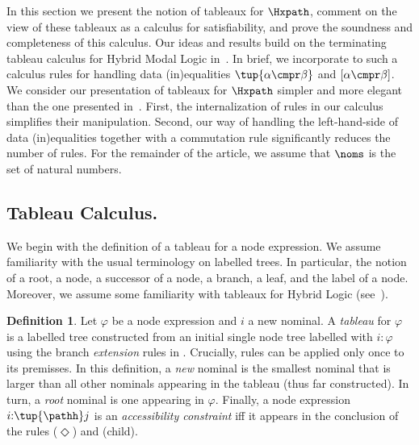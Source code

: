 \documentclass[10pt,a4paper]{amsart}
\theoremstyle{definition}
\newtheorem{defi}[thm]{Definition}
\theoremstyle{remark}
\begin{document}
In this section we present the notion of tableaux for $\Hxpath$, comment on the view of these tableaux as a calculus for satisfiability, and prove the soundness and completeness of this calculus.
Our ideas and results build on the terminating tableau calculus for Hybrid Modal Logic in~\cite{BolanderB07}.
In brief, we incorporate to such a calculus rules for handling data (in)equalities $\tup{\alpha \cmpr \beta}$ and $[\alpha \cmpr \beta]$.
We consider our presentation of tableaux for $\Hxpath$ simpler and more elegant than the one presented in~\cite{ArecesFS17}.
First, the internalization of rules in our calculus simplifies their manipulation.
Second, our way of handling the left-hand-side of data (in)equalities together with a commutation rule significantly reduces the number of rules.
For the remainder of the article, we assume that $\noms$ is the set of natural numbers.

\subsection{Tableau Calculus.}
\label{subsec:rules}

We begin with the definition of a tableau for a node expression.
We assume familiarity with the usual terminology on labelled trees.
In particular, the  notion of a root, a node, a successor of a node, a branch, a leaf, and the label of a node.
Moreover, we assume some familiarity with tableaux for Hybrid Logic (see~\cite{BolanderB07}).

\begin{defi}\label{def:tableau}
    Let $\varphi$ be a node expression and $i$ a new nominal.
    A \emph{tableau} for $\varphi$ is a labelled tree constructed from an initial single node tree labelled with $i{:}\varphi$ using the branch \emph{extension} rules in . Crucially, rules can be applied only once to its premisses. 
    In this definition, a \emph{new} nominal is the smallest nominal that is larger than all other nominals appearing in the tableau (thus far constructed).
    In turn, a \emph{root} nominal is one appearing in $\varphi$.
    Finally, a node expression $i{:}\tup{\pathh}j$ is an \emph{accessibility constraint} iff it appears in the conclusion of the rules ($\Diamond$) and (child).
\end{defi}
\end{document}
